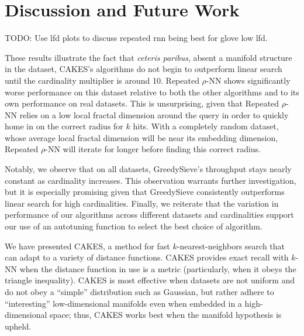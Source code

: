 \section{Discussion and Future Work}
\label{sec:discussion}

{\color{red} TODO: Use lfd plots to discuss repeated rnn being best for glove low lfd.}

These results illustrate the fact that \emph{ceteris paribus}, absent a manifold structure in the dataset, CAKES's algorithms do not begin to outperform linear search until the cardinality multiplier is around 10. 
Repeated $\rho$-NN shows significantly worse performance on this dataset relative to both the other algorithms and to its own performance on real datasets. 
This is unsurprising, given that Repeated $\rho$-NN relies on a low local fractal dimension around the query in order to quickly home in on the correct radius for $k$ hits. 
With a completely random dataset, whose average local fractal dimension will be near its embedding dimension, Repeated $\rho$-NN will iterate for longer before finding this correct radius. 

Notably, we observe that on all datasets, GreedySieve's throughput stays nearly constant as cardinality increases. This observation warrants further investigation, but it is especially promising given that GreedySieve consistently outperforms linear search for high cardinalities. 
Finally, we reiterate that the variation in performance of our algorithms across different datasets and cardinalities support our use of an autotuning function to select the best choice of algorithm. 




We have presented CAKES, a method for fast $k$-nearest-neighbors search that can adapt to a variety of distance functions.
CAKES provides exact recall with $k$-NN when the distance function in use is a metric (particularly, when it obeys the triangle inequality).
CAKES is most effective when datasets are not uniform and do not obey a ``simple'' distribution such as Gaussian, but rather adhere to ``interesting'' low-dimensional manifolds even when embedded in a high-dimensional space;
thus, CAKES works best when the manifold hypothesis is upheld.

